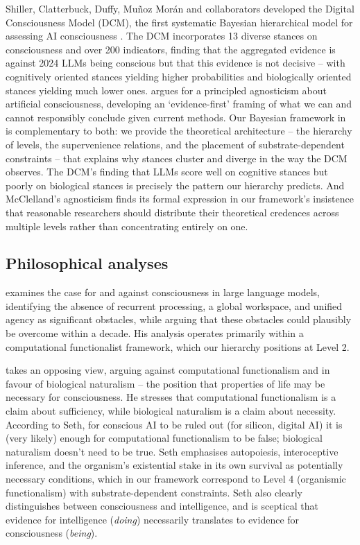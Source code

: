 \documentclass[11pt, a4paper, onecolumn, gdm]{google}
\begin{document}
Shiller, Clatterbuck, Duffy, Muñoz Morán and collaborators developed the Digital Consciousness Model (DCM), the first systematic Bayesian hierarchical model for assessing AI consciousness \citep{shiller2026}.
The DCM incorporates 13 diverse stances on consciousness and over 200 indicators, finding that the aggregated evidence is against 2024 LLMs being conscious but that this evidence is not decisive -- with cognitively oriented stances yielding higher probabilities and biologically oriented stances yielding much lower ones.
\citet{mcclelland2025} argues for a principled agnosticism about artificial consciousness, developing an `evidence-first' framing of what we can and cannot responsibly conclude given current methods.
Our Bayesian framework in  is complementary to both: we provide the theoretical architecture -- the hierarchy of levels, the supervenience relations, and the placement of substrate-dependent constraints -- that explains why stances cluster and diverge in the way the DCM observes.
The DCM's finding that LLMs score well on cognitive stances but poorly on biological stances is precisely the pattern our hierarchy predicts.
And McClelland's agnosticism finds its formal expression in our framework's insistence that reasonable researchers should distribute their theoretical credences across multiple levels rather than concentrating entirely on one.

\subsection{Philosophical analyses}\label{philosophical-analyses}

\citet{chalmers2023} examines the case for and against consciousness in large language models, identifying the absence of recurrent processing, a global workspace, and unified agency as significant obstacles, while arguing that these obstacles could plausibly be overcome within a decade.
His analysis operates primarily within a computational functionalist framework, which our hierarchy positions at Level 2.

\citet{seth2024,seth2026stuff} takes an opposing view, arguing against computational functionalism and in favour of biological naturalism -- the position that properties of life may be necessary for consciousness.
He stresses that computational functionalism is a claim about sufficiency, while biological naturalism is a claim about necessity.
According to Seth, for conscious AI to be ruled out (for silicon, digital AI) it is (very likely) enough for computational functionalism to be false; biological naturalism doesn't need to be true.
Seth emphasises autopoiesis, interoceptive inference, and the organism's existential stake in its own survival as potentially necessary conditions, which in our framework correspond to Level 4 (organismic functionalism) with substrate-dependent constraints. 
Seth also clearly distinguishes between consciousness and intelligence, and is sceptical that evidence for intelligence (\emph{doing}) necessarily translates to evidence for consciousness (\emph{being}).
\end{document}
